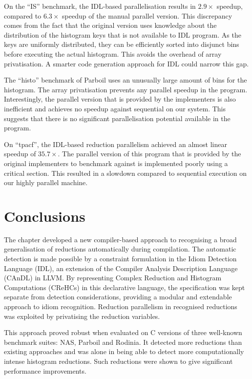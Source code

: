     On the ``IS'' benchmark, the IDL-based parallelisation results in
    $2.9\times$ speedup, compared to $6.3\times$ speedup of the manual parallel
    version.
    This discrepancy comes from the fact that the original version uses
    knowledge about the distribution of the histogram keys that is not available
    to IDL program.
    As the keys are uniformly distributed, they can be efficiently sorted into
    disjunct bins before executing the actual histogram.
    This avoids the overhead of array privatisation.
    A smarter code generation approach for IDL could narrow this gap.

    The ``histo'' benchmark of Parboil uses an unusually large amount of bins
    for the histogram.
    The array privatisation prevents any parallel speedup in the program.
    Interestingly, the parallel version that is provided by the implementers is
    also inefficient and achieves no speedup against sequential on our system.
    This suggests that there is no significant parallelisation potential
    available in the program.

    On ``tpacf'', the IDL-based reduction parallelism achieved an almost linear
    speedup of $35.7\times$.
    The parallel version of this program that is provided by the original
    implementers to benchmark against is implemented poorly using a critical
    section.
    This resulted in a slowdown compared to sequential execution on our highly
    parallel machine.

\section{Conclusions}

    The chapter developed a new compiler-based approach to recognising a broad
    generalisation of reductions automatically during compilation.
    The automatic detection is made possible by a constraint formulation in the
    Idiom Detection Language (IDL), an extension of the
    Compiler Analysis Description Language (CAnDL) in LLVM.
    By representing Complex Reduction and Histogram Computations (CReHCs) in
    this declarative language, the specification was kept separate from
    detection considerations, providing a modular and extendable approach to
    idiom recognition.
    Reduction parallelism in recognised reductions was exploited by
    privatising the reduction variables.

    This approach proved robust when evaluated on C versions of three well-known
    benchmark suites: NAS, Parboil and Rodinia.
    It detected more reductions than existing approaches and was alone in being
    able to detect more computationally intense histogram reductions.
    Such reductions were shown to give significant performance improvements.

